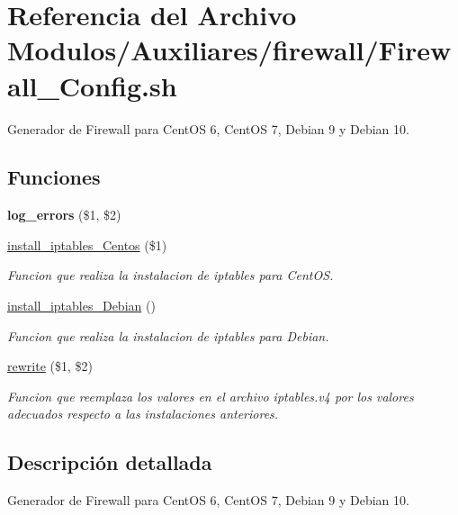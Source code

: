 \hypertarget{Firewall__Config_8sh}{}\section{Referencia del Archivo Modulos/\+Auxiliares/firewall/\+Firewall\+\_\+\+Config.sh}
\label{Firewall__Config_8sh}


Generador de Firewall para Cent\+OS 6, Cent\+OS 7, Debian 9 y Debian 10.  


\subsection*{Funciones}
\begin{DoxyCompactItemize}
\item 
\mbox{\label{Firewall__Config_8sh_a92067b58a8478c9841b2cd9b75ea3565}} 
{\bfseries log\+\_\+errors} (\$1, \$2)
\item 
\hyperlink{Firewall__Config_8sh_a5d5731dd15ca51ce0c45d4e70900a0e1}{install\+\_\+iptables\+\_\+\+Centos} (\$1)
\begin{DoxyCompactList}\small\item\em Funcion que realiza la instalacion de iptables para Cent\+OS. \end{DoxyCompactList}\item 
\mbox{\label{Firewall__Config_8sh_a5188bc7fccdc3d7f66787e858c559954}} 
\hyperlink{Firewall__Config_8sh_a5188bc7fccdc3d7f66787e858c559954}{install\+\_\+iptables\+\_\+\+Debian} ()
\begin{DoxyCompactList}\small\item\em Funcion que realiza la instalacion de iptables para Debian. \end{DoxyCompactList}\item 
\hyperlink{Firewall__Config_8sh_a974e380b6c72b01875d622d64e70372f}{rewrite} (\$1, \$2)
\begin{DoxyCompactList}\small\item\em Funcion que reemplaza los valores en el archivo iptables.\+v4 por los valores adecuados respecto a las instalaciones anteriores. \end{DoxyCompactList}\end{DoxyCompactItemize}


\subsection{Descripción detallada}
Generador de Firewall para Cent\+OS 6, Cent\+OS 7, Debian 9 y Debian 10. 

